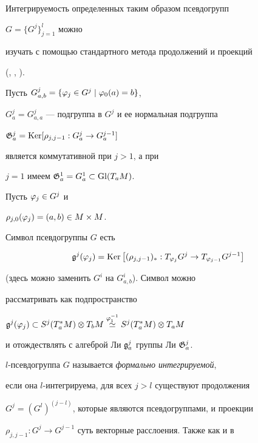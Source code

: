 Интегрируемость определенных таким образом псевдогрупп


$G=\{G^j\}_{j=1}^l$ можно


изучать с помощью стандартного метода продолжений и проекций


(\cite{GS}, \cite{KLV}, \cite{S}).





Пусть $G^j_{a,b}=\{\varphi_j\in G^j\mid\varphi_0(a)=b\}$,


$G^j_a=G^j_{a,a}$ --- подгруппа в $G^j$ и ее нормальная подгруппа


$\frak{G}^j_a=\operatorname{Ker}[\rho_{j,j-1}:G^j_a\to G^{j-1}_a]$ 


является коммутативной при $j>1$, а при


$j=1$ имеем $\frak{G}^1_a=G^1_a\subset\operatorname{Gl}(T_aM)$.








\begin{defn}


Пусть $\varphi_j\in G^j$ и


$\rho_{j,0}(\varphi_j)=(a,b)\in M\times M$.


Символ псевдогруппы $G$ есть


$$


\g^j(\vp_j)=\Ker\big[(\rho_{j,j-1})_*:T_{\vp_j}G^j\to


T_{\vp_{j-1}}G^{j-1}\big]


$$


(здесь можно заменить $G^i$ на $ G^i_{a,b}$). Символ можно


рассматривать как подпространство


$\g^j(\vp_j)\subset S^j(T^*_aM)\ot T_bM\overset{\vp_1^{-1}}{\simeq}{}


S^j(T^*_aM)\ot T_aM$


и отождествлять с алгеброй Ли ${\frak g}^j_a$ группы Ли $\frak{G}^j_a$.


\end{defn}





$l$-псевдогруппа $G$ называется {\em формально интегрируемой},


если она $l$-интегрируема, для всех $j>l$ существуют продолжения


$G^j=(G^l)^{(j-l)}$, которые являются псевдогруппами, и проекции


$\rho_{j,j-1}:G^j\to G^{j-1}$ суть векторные расслоения. Также как и в



